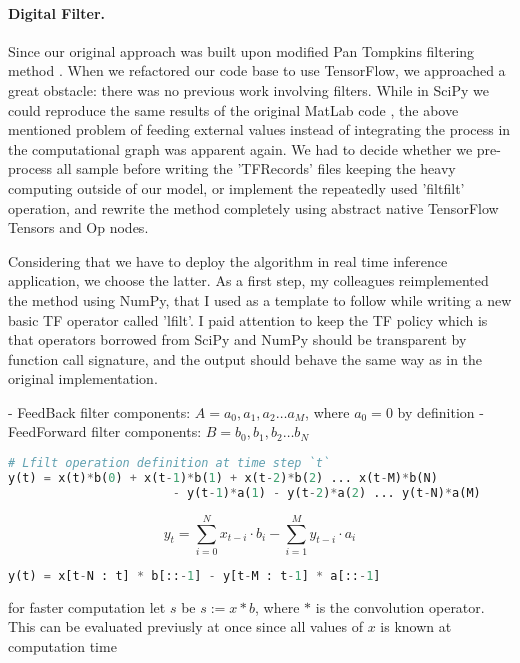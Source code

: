 \paragraph{Digital Filter.}
Since our original approach was built upon modified Pan Tompkins filtering method \cite{pantompkins}.
When we refactored our code base to use TensorFlow, we approached a great obstacle: there was no previous work involving filters.
While in SciPy we could reproduce the same results of the original MatLab code \cite{the-original-matlab-code}, the above mentioned problem of feeding external values instead of integrating the process in the computational graph was apparent again.
We had to decide whether we pre-process all sample before writing the 'TFRecords' files keeping the heavy computing outside of our model, or implement the repeatedly used 'filtfilt' operation, and rewrite the method completely using abstract native TensorFlow Tensors and Op nodes.

Considering that we have to deploy the algorithm in real time inference application, we choose the latter.
As a first step, my colleagues reimplemented the method using NumPy, that I used as a template to follow while writing a new basic TF operator called 'lfilt'.
I paid attention to keep the TF policy which is that operators borrowed from SciPy and NumPy should be transparent by function call signature, and the output should behave the same way as in the original implementation.


- FeedBack filter components:   $A = a_0, a_1, a_2 \dots a_M$, where $a_0 = 0$ by definition
- FeedForward filter components:   $B = b_0, b_1, b_2 \dots b_N$

\begin{lstlisting}[language=Python]
# Lfilt operation definition at time step `t`
y(t) = x(t)*b(0) + x(t-1)*b(1) + x(t-2)*b(2) ... x(t-M)*b(N)
                       - y(t-1)*a(1) - y(t-2)*a(2) ... y(t-N)*a(M)
\end{lstlisting}

$$
y_t = \sum_{i=0}^{N} x_{t-i} \cdot b_{i} - \sum_{i=1}^{M} y_{t-i} \cdot a_{i}
$$


\begin{lstlisting}[language=Python]
y(t) = x[t-N : t] * b[::-1] - y[t-M : t-1] * a[::-1]
\end{lstlisting}


for faster computation let $s$ be $s := x \ast b$, where $\ast$ is the convolution operator. This can be evaluated previusly at once since all values of $x$ is known at computation time

